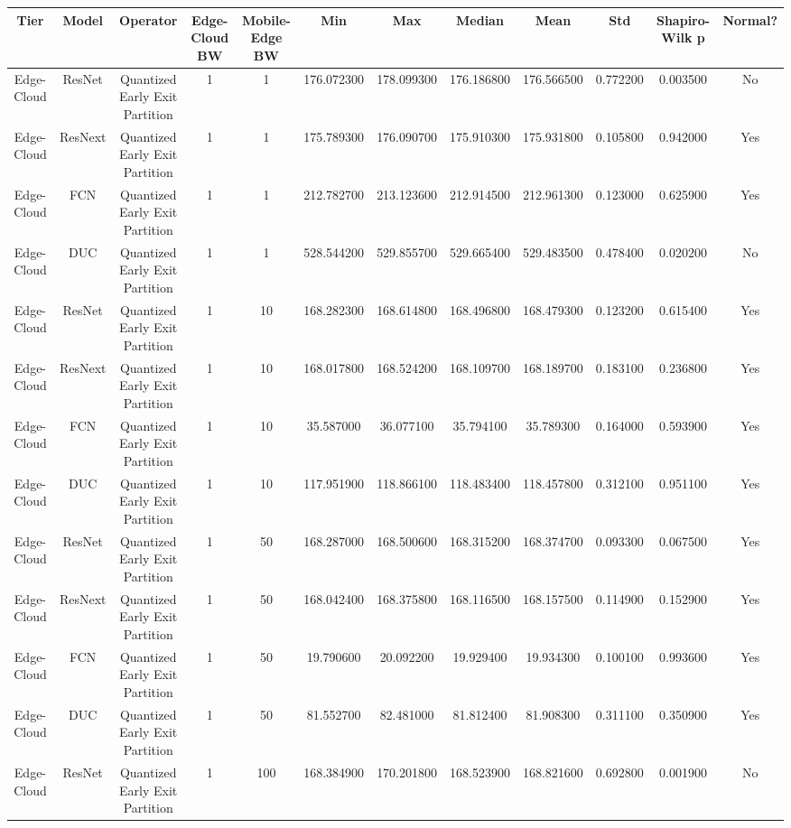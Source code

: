 \begin{tabular}{|c||c||c||c||c||c||c||c||c||c||c||c|}
\toprule
Tier & Model & Operator & Edge-Cloud BW & Mobile-Edge BW & Min & Max & Median & Mean & Std & Shapiro-Wilk p & Normal? \\
\midrule
Edge-Cloud & ResNet & Quantized Early Exit Partition & 1 & 1 & 176.072300 & 178.099300 & 176.186800 & 176.566500 & 0.772200 & 0.003500 & No \\
Edge-Cloud & ResNext & Quantized Early Exit Partition & 1 & 1 & 175.789300 & 176.090700 & 175.910300 & 175.931800 & 0.105800 & 0.942000 & Yes \\
Edge-Cloud & FCN & Quantized Early Exit Partition & 1 & 1 & 212.782700 & 213.123600 & 212.914500 & 212.961300 & 0.123000 & 0.625900 & Yes \\
Edge-Cloud & DUC & Quantized Early Exit Partition & 1 & 1 & 528.544200 & 529.855700 & 529.665400 & 529.483500 & 0.478400 & 0.020200 & No \\
Edge-Cloud & ResNet & Quantized Early Exit Partition & 1 & 10 & 168.282300 & 168.614800 & 168.496800 & 168.479300 & 0.123200 & 0.615400 & Yes \\
Edge-Cloud & ResNext & Quantized Early Exit Partition & 1 & 10 & 168.017800 & 168.524200 & 168.109700 & 168.189700 & 0.183100 & 0.236800 & Yes \\
Edge-Cloud & FCN & Quantized Early Exit Partition & 1 & 10 & 35.587000 & 36.077100 & 35.794100 & 35.789300 & 0.164000 & 0.593900 & Yes \\
Edge-Cloud & DUC & Quantized Early Exit Partition & 1 & 10 & 117.951900 & 118.866100 & 118.483400 & 118.457800 & 0.312100 & 0.951100 & Yes \\
Edge-Cloud & ResNet & Quantized Early Exit Partition & 1 & 50 & 168.287000 & 168.500600 & 168.315200 & 168.374700 & 0.093300 & 0.067500 & Yes \\
Edge-Cloud & ResNext & Quantized Early Exit Partition & 1 & 50 & 168.042400 & 168.375800 & 168.116500 & 168.157500 & 0.114900 & 0.152900 & Yes \\
Edge-Cloud & FCN & Quantized Early Exit Partition & 1 & 50 & 19.790600 & 20.092200 & 19.929400 & 19.934300 & 0.100100 & 0.993600 & Yes \\
Edge-Cloud & DUC & Quantized Early Exit Partition & 1 & 50 & 81.552700 & 82.481000 & 81.812400 & 81.908300 & 0.311100 & 0.350900 & Yes \\
Edge-Cloud & ResNet & Quantized Early Exit Partition & 1 & 100 & 168.384900 & 170.201800 & 168.523900 & 168.821600 & 0.692800 & 0.001900 & No \\

\end{tabular}

